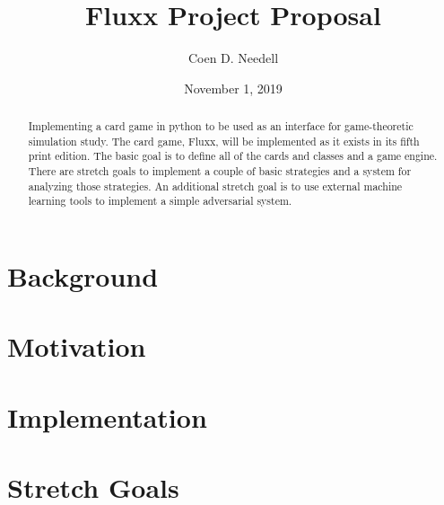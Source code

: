 \documentclass[10pt,letterpaper,prl]{revtex4}
\begin{document}
\title{Fluxx Project Proposal}
\author{Coen D. Needell}
\date{November 1, 2019}
\begin{abstract}
Implementing a card game in python to be used as an interface for game-theoretic simulation study. The card game, Fluxx, will be implemented as it exists in its fifth print edition. The basic goal is to define all of the cards and classes and a game engine. There are stretch goals to implement a couple of basic strategies and a system for analyzing those strategies. An additional stretch goal is to use external machine learning tools to implement a simple adversarial system. 
\end{abstract}

\maketitle

\section*{Background}



\section*{Motivation}

\section*{Implementation}

\section*{Stretch Goals}
\end{document}
